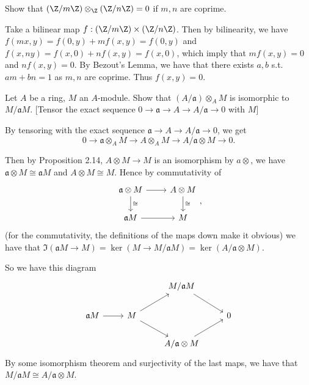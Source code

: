 \documentclass[a4paper]{exam}
\begin{document}
\begin{questions}
	\question Show that $(\Z / m\Z) \otimes _{\Z} (\Z/n\Z) = 0$ if $m,n $ are coprime.
	\begin{solution}
		Take a bilinear map $f: (\Z / m\Z) \times (\Z / n\Z) $.
		Then by bilinearity, we have $f(mx,y) = f(0,y) + mf(x,y) = f(0,y) $ and $f(x,ny) = f(x,0) + nf(x,y) = f(x,0) $, which imply that $mf(x,y) = 0 $ and $nf(x,y) = 0 $.
		By Bezout's Lemma, we have that there exists $a,b $ s.t. $am+bn = 1 $ as $m,n $ are coprime.
		Thus $f(x,y) = 0 $.
	\end{solution}

	\question Let $A $ be a ring, $M $ an $A $-module. Show that $(A / \mathfrak{a}) \otimes_A M$ is isomorphic to $M / \mathfrak{a}M $. [Tensor the exact sequence $0\to \mathfrak{a}\to A\to A / \mathfrak{a} \to 0 $ with $M $]
	\begin{solution}
		By tensoring with the exact sequence $\mathfrak{a}\to A \to A / \mathfrak{a} \to 0 $, we get
		\[
			0 \to \mathfrak{a}\otimes_A M \to A \otimes_A M \to A / \mathfrak{a} \otimes M \to 0 \tag{Prop 2.8}
		.\]

		Then by Proposition 2.14, $A \otimes M \to M $ is an isomorphism by $a\otimes  $, we have $\mathfrak{a}\otimes M \cong \mathfrak{a}M $ and $A\otimes M \cong M $.
		Hence by commutativity of
		\[
			\begin{tikzcd}
				\mathfrak{a}\otimes M & A \otimes M\\
				\mathfrak{a}M & M
				\arrow[from=1-1,to=1-2]
				\arrow["\cong",from=1-1,to=2-1]
				\arrow[from=2-1,to=2-2]
				\arrow["\cong",from=1-2,to=2-2]
			\end{tikzcd}
		,\]
		(for the commutativity, the definitions of the maps down make it obvious) we have that $\Im(\mathfrak{a}M\to M)= \ker(M\to M / \mathfrak{a}M) = \ker(A / \mathfrak{a}\otimes M)$.

		So we have this diagram
		\[
			\begin{tikzcd}
				&& M / \mathfrak{a}M &\\
				\mathfrak{a}M & M &&0\\
					      && A / \mathfrak{a} \otimes M &
					      \arrow[from=2-1,to=2-2]
					      \arrow[from=2-2,to=1-3]
					      \arrow[from=2-2,to=3-3]
					      \arrow[from=3-3,to=2-4]
					      \arrow[from=1-3,to=2-4]
			\end{tikzcd}
		\]
		By some isomorphism theorem and surjectivity of the last maps, we have that $M / \mathfrak{a}M \cong A / \mathfrak{a} \otimes M $.
	\end{solution}


\end{questions}
\end{document}
